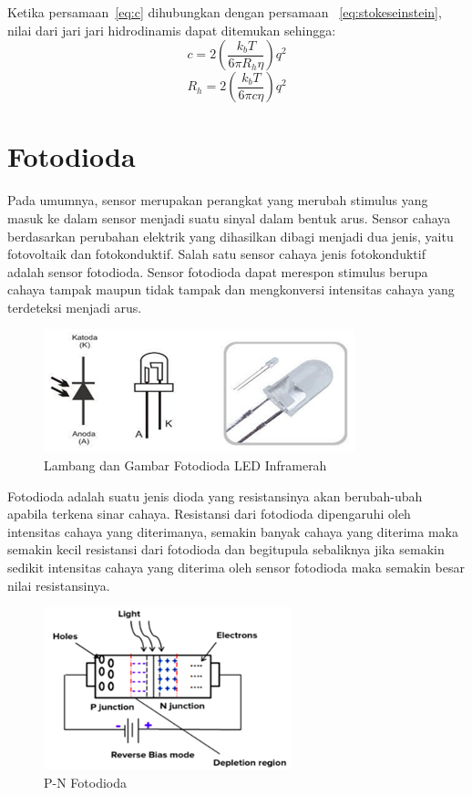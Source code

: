Ketika persamaan~\ref{eq:c} dihubungkan dengan persamaan ~\ref{eq:stokeseinstein},
nilai dari jari jari hidrodinamis dapat ditemukan sehingga:
\begin{equation*}
    c = 2 \left(\frac{k_b T}{6 \pi R_h \eta} \right) q^2
\end{equation*}
\begin{equation}
    R_h = 2 \left(\frac{k_b T}{6 \pi c \eta} \right) q^2
    \label{eq:rh}
\end{equation}



\section{Fotodioda}
Pada umumnya, sensor merupakan perangkat yang merubah stimulus yang masuk ke dalam sensor menjadi
suatu sinyal dalam bentuk arus. Sensor cahaya berdasarkan perubahan elektrik yang dihasilkan dibagi
menjadi dua jenis, yaitu fotovoltaik dan fotokonduktif. Salah satu sensor cahaya jenis fotokonduktif
adalah sensor fotodioda. Sensor fotodioda dapat merespon stimulus berupa cahaya tampak maupun tidak
tampak dan mengkonversi intensitas cahaya yang terdeteksi menjadi arus\cite{Setyaningsih2017}.

\begin{figure}[H]
    \centering
    \includegraphics{Images/Fotodioda.png}
    \caption{Lambang dan Gambar Fotodioda LED Inframerah}
    \label{fig:led photodiode}
\end{figure}

Fotodioda adalah suatu jenis dioda yang resistansinya akan berubah-ubah apabila terkena sinar
cahaya. Resistansi dari fotodioda dipengaruhi oleh intensitas cahaya yang diterimanya, semakin
banyak cahaya yang diterima maka semakin kecil resistansi dari fotodioda dan begitupula sebaliknya
jika semakin sedikit intensitas cahaya yang diterima oleh sensor fotodioda maka semakin besar nilai
resistansinya\cite{Setyaningsih2017,DendyArta2020}.

\begin{figure}[H]
    \centering
    \includegraphics{Images/Bias Fotodioda.png}
    \caption{P-N Fotodioda}
    \label{fig:p-n photodiode}
\end{figure}

